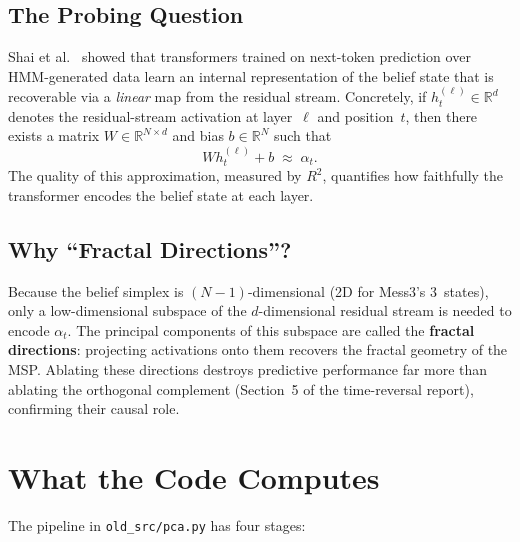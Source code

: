 \documentclass[11pt]{article}
\newcommand{\file}[1]{\texttt{#1}}
\begin{document}
\subsection{The Probing Question}

Shai et al.~\cite{shai2024transformers} showed that transformers trained on next-token prediction over HMM-generated data learn an internal representation of the belief state that is recoverable via a \emph{linear} map from the residual stream.  Concretely, if $h_t^{(\ell)} \in \mathbb{R}^{d}$ denotes the residual-stream activation at layer~$\ell$ and position~$t$, then there exists a matrix $W \in \mathbb{R}^{N \times d}$ and bias $b \in \mathbb{R}^N$ such that
\begin{equation}
  W h_t^{(\ell)} + b \;\approx\; \alpha_t.
\end{equation}
The quality of this approximation, measured by $R^2$, quantifies how faithfully the transformer encodes the belief state at each layer.

\subsection{Why ``Fractal Directions''?}

Because the belief simplex is $(N{-}1)$-dimensional (2D for Mess3's 3~states), only a low-dimensional subspace of the $d$-dimensional residual stream is needed to encode $\alpha_t$.  The principal components of this subspace are called the \textbf{fractal directions}: projecting activations onto them recovers the fractal geometry of the MSP.  Ablating these directions destroys predictive performance far more than ablating the orthogonal complement (Section~5 of the time-reversal report), confirming their causal role.

\section{What the Code Computes}\label{sec:pipeline}

The pipeline in \file{old\_src/pca.py} has four stages:
\end{document}
